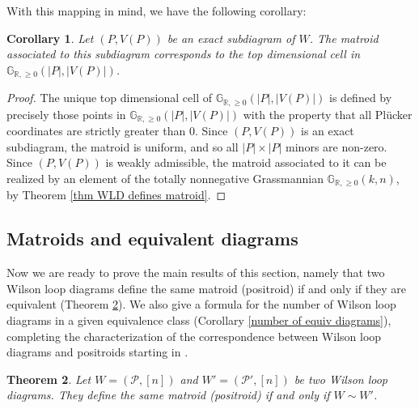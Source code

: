 \documentclass[11pt]{article}
\newcommand{\R}{\mathbb{R}}
\newcommand{\Gr}{\mathbb{G}_{\R, \geq 0}}
\newcommand{\cP}{\mathcal{P}}
\newtheorem{thm}{Theorem}[section]
\newtheorem{cor}[thm]{Corollary}
\theoremstyle{remark}
\theoremstyle{definition}
\begin{document}
With this mapping in mind, we have the following corollary:

\begin{cor}
Let $(P, V(P))$ be an exact subdiagram of $W$. The matroid associated to this subdiagram corresponds to the top dimensional cell in $\Gr(|P|, |V(P)|)$.
\end{cor}

\begin{proof}
The unique top dimensional cell of $\Gr(|P|, |V(P)|)$ is defined by precisely those points in $\Gr(|P|, |V(P)|)$ with the property that all Pl\"ucker coordinates are strictly greater than $0$. Since $(P, V(P))$ is an exact subdiagram, the matroid is uniform, and so all $|P| \times |P|$ minors are non-zero. Since $(P, V(P))$ is weakly admissible, the matroid associated to it can be realized by an element of the totally nonnegative Grassmannian $\Gr(k,n)$, by Theorem \ref{thm WLD defines matroid}.
\end{proof}


\subsection{Matroids and equivalent diagrams \label{sec: matroids and equivalence}}

Now we are ready to prove the main results of this section, namely that two Wilson loop diagrams define the same matroid (positroid) if and only if they are equivalent (Theorem \ref{same matroid iff equiv}). We also give a formula for the number of Wilson loop diagrams in a given equivalence class (Corollary \ref{number of equiv diagrams}), completing the characterization of the correspondence between Wilson loop diagrams and positroids starting in \cite{wilsonloop}.

\begin{thm}\label{same matroid iff equiv}
Let $W= (\cP, [n])$ and $W'= (\cP', [n])$ be two Wilson loop diagrams. They define the same matroid (positroid) if and only if $W \sim W'$.
\end{thm}
\end{document}
